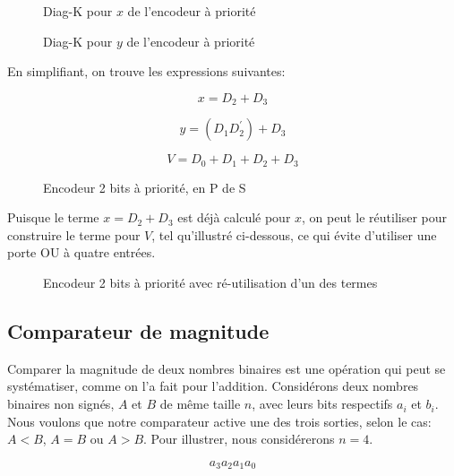 \documentclass[11pt]{article}
\begin{document}
\begin{figure}[htbp]
\centering

\caption{\label{fig:orgabdad24}Diag-K pour \(x\) de l'encodeur à priorité}
\end{figure}

\begin{figure}[htbp]
\centering

\caption{\label{fig:org3d2551c}Diag-K pour \(y\) de l'encodeur à priorité}
\end{figure}

En simplifiant, on trouve les expressions suivantes:

$$ x = D_2 + D_3 $$

$$ y = (D_1 D_2^\prime) + D_3 $$

$$ V = D_0 + D_1 + D_2 + D_3 $$

\begin{figure}[htbp]
\centering

\caption{\label{fig:org65ebb01}Encodeur 2 bits à priorité, en P de S}
\end{figure}

Puisque le terme \(x = D_2 + D_3\) est déjà calculé pour \(x\), on
peut le réutiliser pour construire le terme pour \(V\), tel
qu'illustré ci-dessous, ce qui évite d'utiliser une porte OU à quatre
entrées.

\begin{figure}[htbp]
\centering

\caption{\label{fig:orge42496d}Encodeur 2 bits à priorité avec ré-utilisation d'un des termes}
\end{figure}


\subsection{Comparateur de magnitude}
\label{sec:orgc721c64}

Comparer la magnitude de deux nombres binaires est une opération qui
peut se systématiser, comme on l'a fait pour l'addition. Considérons
deux nombres binaires non signés, \(A\) et \(B\) de même taille \(n\),
avec leurs bits respectifs \(a_i\) et \(b_i\). Nous voulons que notre
comparateur active une des trois sorties, selon le cas: \(A < B\), \(A
= B\) ou \(A > B\). Pour illustrer, nous considérerons \(n = 4\).

$$ a_3 a_2 a_1 a_0 $$
\end{document}
